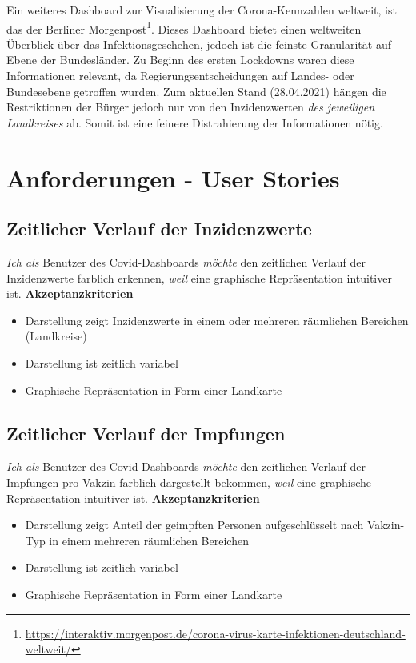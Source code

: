 \documentclass[conference]{IEEEtran}
\begin{document}
Ein weiteres Dashboard zur Visualisierung der Corona-Kennzahlen weltweit, ist das der Berliner Morgenpost\footnote{\url{https://interaktiv.morgenpost.de/corona-virus-karte-infektionen-deutschland-weltweit/}}. Dieses Dashboard bietet einen weltweiten Überblick über das Infektionsgeschehen, jedoch ist die feinste Granularität auf Ebene der Bundesländer. Zu Beginn des ersten Lockdowns waren diese Informationen relevant, da Regierungsentscheidungen auf Landes- oder Bundesebene getroffen wurden. Zum aktuellen Stand (28.04.2021) hängen die Restriktionen der Bürger jedoch nur von den Inzidenzwerten \textit{des jeweiligen Landkreises} ab. Somit ist eine feinere Distrahierung der Informationen nötig.

\section{Anforderungen - User Stories}
\subsection{Zeitlicher Verlauf der Inzidenzwerte}
\textit{Ich als} Benutzer des Covid-Dashboards
\textit{möchte} den zeitlichen Verlauf der Inzidenzwerte farblich erkennen,
\textit{weil} eine graphische Repräsentation intuitiver ist.
\newline
\textbf{Akzeptanzkriterien}
\begin{itemize}
    \item Darstellung zeigt Inzidenzwerte in einem oder mehreren räumlichen Bereichen (Landkreise)
    \item Darstellung ist zeitlich variabel
    \item Graphische Repräsentation in Form einer Landkarte
\end{itemize}

\subsection{Zeitlicher Verlauf der Impfungen}
\textit{Ich als} Benutzer des Covid-Dashboards
\textit{möchte} den zeitlichen Verlauf der Impfungen pro Vakzin farblich dargestellt bekommen,
\textit{weil} eine graphische Repräsentation intuitiver ist.
\textbf{Akzeptanzkriterien}
\begin{itemize}
    \item Darstellung zeigt Anteil der geimpften Personen aufgeschlüsselt nach Vakzin-Typ in einem mehreren räumlichen Bereichen
    \item Darstellung ist zeitlich variabel
    \item Graphische Repräsentation in Form einer Landkarte
\end{itemize}
\end{document}
